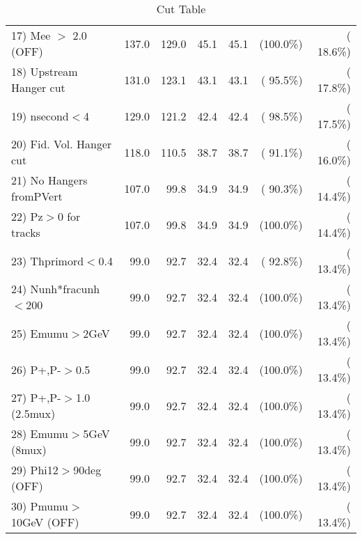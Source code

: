 \begin{table}[h!]
\begin{tabular}{||l||r|r|r|r|r|r||}
 17) Mee $>$ 2.0  (OFF)   &        137.0 &        129.0 &         45.1 &         45.1 & (100.0\%) & ( 18.6\%) \\
 18) Upstream Hanger cut  &        131.0 &        123.1 &         43.1 &         43.1 & ( 95.5\%) & ( 17.8\%) \\
 19) nsecond$<$4          &        129.0 &        121.2 &         42.4 &         42.4 & ( 98.5\%) & ( 17.5\%) \\
 20) Fid. Vol. Hanger cut &        118.0 &        110.5 &         38.7 &         38.7 & ( 91.1\%) & ( 16.0\%) \\
 21) No Hangers fromPVert &        107.0 &         99.8 &         34.9 &         34.9 & ( 90.3\%) & ( 14.4\%) \\
 22) Pz$>$0 for tracks    &        107.0 &         99.8 &         34.9 &         34.9 & (100.0\%) & ( 14.4\%) \\
 23) Thprimord$<$0.4      &         99.0 &         92.7 &         32.4 &         32.4 & ( 92.8\%) & ( 13.4\%) \\
 24) Nunh*fracunh$<$200   &         99.0 &         92.7 &         32.4 &         32.4 & (100.0\%) & ( 13.4\%) \\
 25) Emumu$>$2GeV         &         99.0 &         92.7 &         32.4 &         32.4 & (100.0\%) & ( 13.4\%) \\
 26) P+,P-$>$0.5          &         99.0 &         92.7 &         32.4 &         32.4 & (100.0\%) & ( 13.4\%) \\
 27) P+,P-$>$1.0 (2.5mux) &         99.0 &         92.7 &         32.4 &         32.4 & (100.0\%) & ( 13.4\%) \\
 28) Emumu$>$5GeV  (8mux) &         99.0 &         92.7 &         32.4 &         32.4 & (100.0\%) & ( 13.4\%) \\
 29) Phi12$>$90deg  (OFF) &         99.0 &         92.7 &         32.4 &         32.4 & (100.0\%) & ( 13.4\%) \\
 30) Pmumu$>$10GeV  (OFF) &         99.0 &         92.7 &         32.4 &         32.4 & (100.0\%) & ( 13.4\%) \\
 \hline
 \hline
 \end{tabular}
 \caption{Cut Table           }
 \label{tab-cutcohjpsi-mumu_ccdis}
 \end{table}
